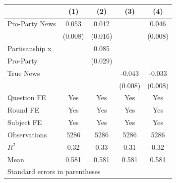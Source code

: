 \begin{tabular}{l*{4}{c}}
\hline\hline
                    &\multicolumn{1}{c}{(1)}&\multicolumn{1}{c}{(2)}&\multicolumn{1}{c}{(3)}&\multicolumn{1}{c}{(4)}\\
\hline
Pro-Party News      &    0.053&    0.012&         &    0.046\\
                    &  (0.008)&  (0.016)&         &  (0.008)\\
Partisanship x      &         &    0.085&         &         \\
Pro-Party           &         &  (0.029)&         &         \\
True News           &         &         &   -0.043&   -0.033\\
                    &         &         &  (0.008)&  (0.008)\\
Question FE         &      Yes&      Yes&      Yes&      Yes\\
Round FE            &      Yes&      Yes&      Yes&      Yes\\
Subject FE          &      Yes&      Yes&      Yes&      Yes\\
\hline
Observations        &     5286&     5286&     5286&     5286\\
\(R^{2}\)           &     0.32&     0.33&     0.31&     0.32\\
Mean                &    0.581&    0.581&    0.581&    0.581\\
\hline\hline
\multicolumn{5}{l}{\footnotesize Standard errors in parentheses}\\
\end{tabular}
